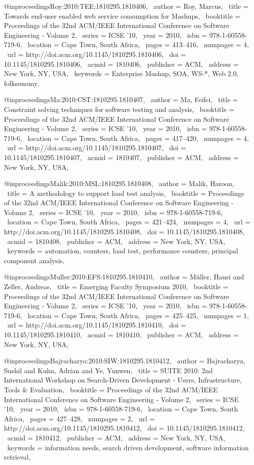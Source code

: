 @inproceedings{Roy:2010:TEE:1810295.1810406,
 author = {Roy, Marcus},
 title = {Towards end-user enabled web service consumption for Mashups},
 booktitle = {Proceedings of the 32nd ACM/IEEE International Conference on Software Engineering - Volume 2},
 series = {ICSE '10},
 year = {2010},
 isbn = {978-1-60558-719-6},
 location = {Cape Town, South Africa},
 pages = {413--416},
 numpages = {4},
 url = {http://doi.acm.org/10.1145/1810295.1810406},
 doi = {10.1145/1810295.1810406},
 acmid = {1810406},
 publisher = {ACM},
 address = {New York, NY, USA},
 keywords = {Enterprise Mashup, SOA, WS-*, Web 2.0, folksonomy},
} 

@inproceedings{Ma:2010:CST:1810295.1810407,
 author = {Ma, Feifei},
 title = {Constraint solving techniques for software testing and analysis},
 booktitle = {Proceedings of the 32nd ACM/IEEE International Conference on Software Engineering - Volume 2},
 series = {ICSE '10},
 year = {2010},
 isbn = {978-1-60558-719-6},
 location = {Cape Town, South Africa},
 pages = {417--420},
 numpages = {4},
 url = {http://doi.acm.org/10.1145/1810295.1810407},
 doi = {10.1145/1810295.1810407},
 acmid = {1810407},
 publisher = {ACM},
 address = {New York, NY, USA},
} 

@inproceedings{Malik:2010:MSL:1810295.1810408,
 author = {Malik, Haroon},
 title = {A methodology to support load test analysis},
 booktitle = {Proceedings of the 32nd ACM/IEEE International Conference on Software Engineering - Volume 2},
 series = {ICSE '10},
 year = {2010},
 isbn = {978-1-60558-719-6},
 location = {Cape Town, South Africa},
 pages = {421--424},
 numpages = {4},
 url = {http://doi.acm.org/10.1145/1810295.1810408},
 doi = {10.1145/1810295.1810408},
 acmid = {1810408},
 publisher = {ACM},
 address = {New York, NY, USA},
 keywords = {automation, counters, load test, performance counters, principal component analysis},
} 

@inproceedings{Muller:2010:EFS:1810295.1810410,
 author = {M\"{u}ller, Hausi and Zeller, Andreas},
 title = {Emerging Faculty Symposium 2010},
 booktitle = {Proceedings of the 32nd ACM/IEEE International Conference on Software Engineering - Volume 2},
 series = {ICSE '10},
 year = {2010},
 isbn = {978-1-60558-719-6},
 location = {Cape Town, South Africa},
 pages = {425--425},
 numpages = {1},
 url = {http://doi.acm.org/10.1145/1810295.1810410},
 doi = {10.1145/1810295.1810410},
 acmid = {1810410},
 publisher = {ACM},
 address = {New York, NY, USA},
} 

@inproceedings{Bajracharya:2010:SIW:1810295.1810412,
 author = {Bajracharya, Sushil and Kuhn, Adrian and Ye, Yunwen},
 title = {SUITE 2010: 2nd International Workshop on Search-Driven Development - Users, Infrastructure, Tools \& Evaluation},
 booktitle = {Proceedings of the 32nd ACM/IEEE International Conference on Software Engineering - Volume 2},
 series = {ICSE '10},
 year = {2010},
 isbn = {978-1-60558-719-6},
 location = {Cape Town, South Africa},
 pages = {427--428},
 numpages = {2},
 url = {http://doi.acm.org/10.1145/1810295.1810412},
 doi = {10.1145/1810295.1810412},
 acmid = {1810412},
 publisher = {ACM},
 address = {New York, NY, USA},
 keywords = {information needs, search driven development, software information retrieval},
} 

